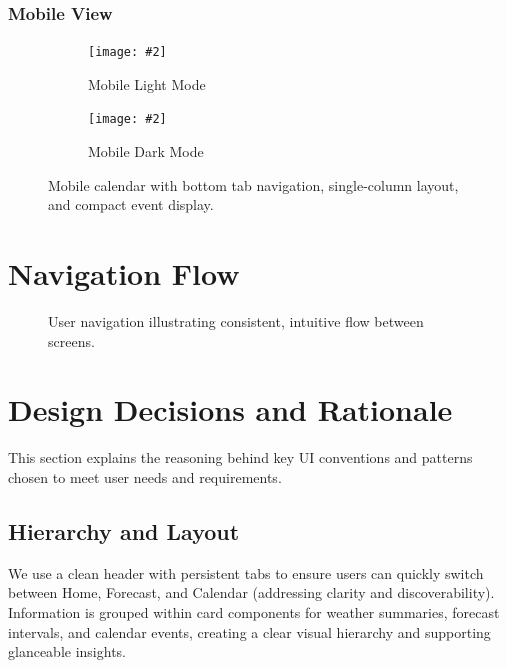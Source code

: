 \documentclass[11pt,a4paper]{article}
\newcommand{\maxgraph}[2][]{%
  \texttt{[image: \#2]}%
}
\begin{document}
\subsubsection*{Mobile View}
\FloatBarrier
\begin{figure}[H]
  \centering
  \begin{subfigure}{0.48\linewidth}
    \maxgraph[width=\linewidth]{calendar_lightmode_mobile.jpg}
    \caption{Mobile Light Mode}
  \end{subfigure}\hfill
  \begin{subfigure}{0.48\linewidth}
    \maxgraph[width=\linewidth]{calendar_darkmode_mobile.jpg}
    \caption{Mobile Dark Mode}
  \end{subfigure}
  \caption{Mobile calendar with bottom tab navigation, single-column layout, and compact event display.}
  \label{fig:calendar_mobile}
\end{figure}
\FloatBarrier

\section{Navigation Flow}
\FloatBarrier
\begin{figure}[H]
  \centering
  \caption{User navigation illustrating consistent, intuitive flow between screens.}
  \label{fig:flow}
\end{figure}
\FloatBarrier

\section{Design Decisions and Rationale}
This section explains the reasoning behind key UI conventions and patterns chosen to meet user needs and requirements.

\subsection{Hierarchy and Layout}
We use a clean header with persistent tabs to ensure users can quickly switch between Home, Forecast, and Calendar (addressing clarity and discoverability). Information is grouped within card components for weather summaries, forecast intervals, and calendar events, creating a clear visual hierarchy and supporting glanceable insights.
\end{document}

